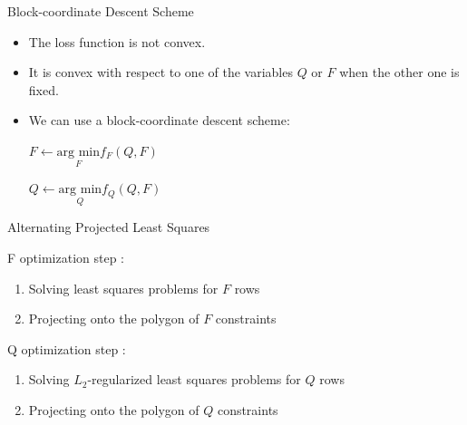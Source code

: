 \documentclass{beamer}\usepackage[]{graphicx}\usepackage[]{color}
\begin{document}

\begin{frame}{Block-coordinate Descent Scheme}

\begin{itemize}

\item The loss function is not convex.

\item It is convex with respect to one of the variables $Q$ or $F$ when the other one is fixed.

\item We can use a block-coordinate descent scheme:

\begin{algorithmic}

$ F \gets \underset{F}{\text{arg min}} f_F(Q,F)$

$ Q \gets \underset{Q}{\text{arg min}} f_Q(Q,F)$

\EndFor
\end{algorithmic}

\end{itemize}

\end{frame}


\begin{frame}{Alternating Projected Least Squares}

F optimization step : 
\begin{enumerate}
  \item Solving least squares problems for $F$ rows
  \item Projecting onto the polygon of $F$ constraints
\end{enumerate}
Q optimization step : 
\begin{enumerate}
  \item Solving $L_2$-regularized least squares problems for $Q$ rows
  \item Projecting onto the polygon of $Q$ constraints
\end{enumerate}

\end{frame}

\end{document}

